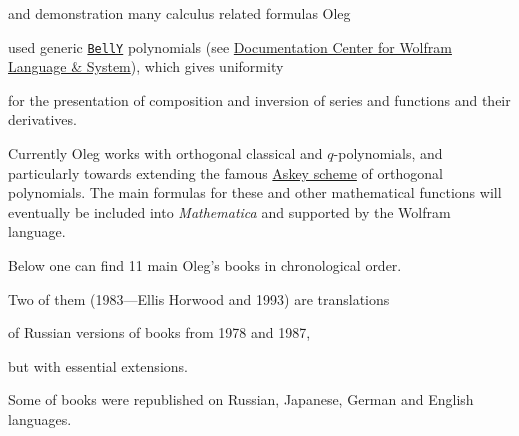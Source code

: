 and demonstration many calculus related formulas Oleg 


used generic \href{http://reference.wolfram.com/language/ref/BellY.html}{\tt BellY} polynomials (see \href{http://reference.wolfram.com/language/ref/BellY.html}{Documentation Center for Wolfram Language \& System}), which gives uniformity 

for the presentation of composition and inversion of series and functions and their derivatives.





Currently Oleg works with orthogonal classical and $q$-polynomials, and particularly towards extending the famous \href{http://dlmf.nist.gov/search/search?q=Askey+Scheme}{Askey scheme} of orthogonal polynomials. The main formulas for these and other mathematical functions will eventually be included into \textit{Mathematica} and supported by the Wolfram language. 





Below one can find 11 main Oleg's books in chronological order. 

Two of them (1983---Ellis Horwood and 1993) are translations

of Russian versions of books from 1978 and 1987, 

but with essential extensions. 

Some of books were republished on Russian, Japanese, German and English languages.



